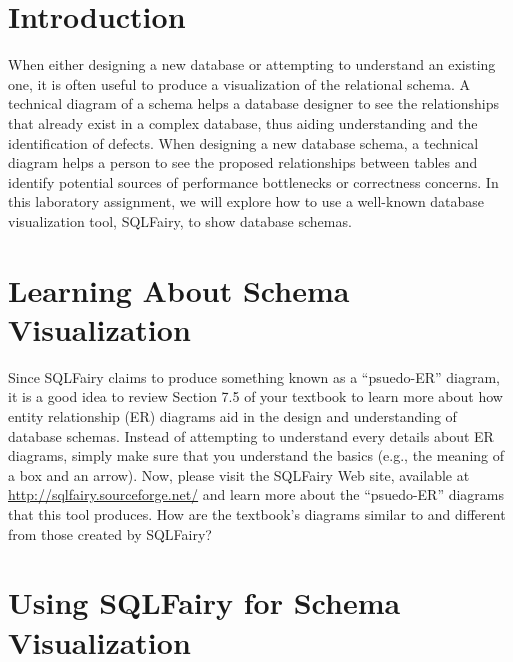 


\usepackage[compact]{titlesec}



\section*{Introduction}

When either designing a new database or attempting to understand an existing one, it is often useful to produce a
visualization of the relational schema.  A technical diagram of a schema helps a database designer to see the
relationships that already exist in a complex database, thus aiding understanding and the identification of defects.
When designing a new database schema, a technical diagram helps a person to see the proposed relationships between
tables and identify potential sources of performance bottlenecks or correctness concerns. In this laboratory assignment,
we will explore how to use a well-known database visualization tool, SQLFairy, to show database schemas.

\vspace*{-.05in}
\section*{Learning About Schema Visualization}

Since SQLFairy claims to produce something known as a ``psuedo-ER'' diagram, it is a good idea to review Section 7.5 of
your textbook to learn more about how entity relationship (ER) diagrams aid in the design and understanding of database
schemas. Instead of attempting to understand every details about ER diagrams, simply make sure that you understand 
the basics (e.g., the meaning of a box and an arrow). Now, please visit the SQLFairy Web site, available at
\url{http://sqlfairy.sourceforge.net/} and learn more about the ``psuedo-ER'' diagrams that this tool produces. How are
the textbook's diagrams similar to and different from those created by SQLFairy?

\vspace*{-.05in}
\section*{Using SQLFairy for Schema Visualization}


